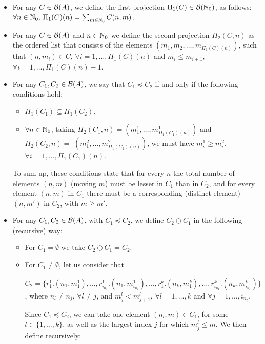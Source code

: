 \begin{enumerate}
\begin{itemize}
\item For any $C \in {\cal B}(A)$, 
we define the first projection
$\Pi_1(C) \in {\cal B}(\mathbb{N}_{0})$, 
as follows: $\forall n \in \mathbb{N}_{0},\,
\Pi_1(C)(n) = \sum_{m\in \mathbb{N}_{0}} C(n,m)$.
%
\item For any $C \in {\cal B}(A)$
and $n\in \mathbb{N}_{0}$ we define the second projection 
$\Pi_2(C,n)$ as the ordered list that consists of the
elements $(m_1,m_2,\ldots,m_{\Pi_1(C)(n)})$,
such that $(n,m_i) \in C$, $\forall i=1,\ldots, \Pi_1(C)(n)$
and $m_i \leq m_{i+1}$,
$\forall i=1,\ldots, \Pi_1(C)(n)-1$.
%
\item For any $C_1,C_2 \in {\cal B}(A)$, we say that
$C_1 \preceq C_2$ if and only if the following conditions hold:
  \begin{itemize}
  \item $\Pi_1(C_1) \subseteq \Pi_1(C_2)$.
  \item \mbox{$\forall n \in \mathbb{N}_{0}$}, taking \mbox{$\Pi_2(C_1,n) = (m^1_1,\ldots,
        m^1_{\Pi_1(C_1)(n)})$} and
        \mbox{$\Pi_2(C_2,n) = $} \linebreak
        $(m^2_1,\ldots,m^2_{\Pi_1(C_2)(n)})$,
        we must have  $m^1_i \geq m^2_i$, $\forall i=1,\ldots,
        \Pi_1(C_1)(n)$.
  \end{itemize}
%
%  
To sum up, these conditions state that for every $n$ the total number of
elements $(n,m)$ (moving $m$) must be lesser in $C_1$ than in $C_2$, and 
for every element $(n,m)$ in $C_1$ there must be a 
corresponding (distinct element) $(n,m')$ in $C_2$, with $m\geq m'$.
%
\item For any $C_1,C_2 \in {\cal B}(A)$, with $C_1 \preceq C_2$,
we define $C_2 \ominus C_1$ in the following (recursive) way: 
  \begin{itemize}
  \item For $C_1 = \emptyset$ we take $C_2 \ominus C_1 = C_2$.
  \item For $C_1 \neq \emptyset$, let us consider that 

        \noindent $C_2 = \{ r^1_1.(n_1,m^1_1), \ldots,
         r^1_{i_{n_{1}}}.(n_1,m^1_{i_{n_{1}}}),
        \ldots, r^k_1.(n_k,m^k_1),\ldots, r^k_{i_{n_{k}}}.(n_k,m^k_{i_{n_{k}}}) \}$,
        where $n_l \neq n_j$, $\forall l \neq j$, and
        $m^l_j < m^l_{j+1}$, $\forall l=1,\ldots,k$ and $\forall
        j=1,\ldots,i_{n_{l}}$.

        Since $C_1 \preceq C_2$, we can take one element $(n_l,m) \in C_1$, 
        for some $l\in \{1,\ldots,k\}$, as well as the largest index $j$
        for which $m^l_{j} \leq m$. We then define recursively:
       

\end{itemize}
\end{itemize}
\end{enumerate}
